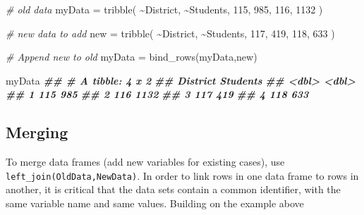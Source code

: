 \documentclass[
  12pt,
]{krantz}
\newenvironment{Shaded}{\begin{snugshade}}{\end{snugshade}}
\newcommand{\CommentTok}[1]{\textcolor[rgb]{0.56,0.35,0.01}{\textit{#1}}}
\newcommand{\DecValTok}[1]{\textcolor[rgb]{0.00,0.00,0.81}{#1}}
\newcommand{\DocumentationTok}[1]{\textcolor[rgb]{0.56,0.35,0.01}{\textbf{\textit{#1}}}}
\newcommand{\FunctionTok}[1]{\textcolor[rgb]{0.00,0.00,0.00}{#1}}
\newcommand{\NormalTok}[1]{#1}
\newcommand{\OtherTok}[1]{\textcolor[rgb]{0.56,0.35,0.01}{#1}}
\newcommand{\SpecialCharTok}[1]{\textcolor[rgb]{0.00,0.00,0.00}{#1}}
\begin{document}
\begin{Shaded}
\begin{Highlighting}[]
  \CommentTok{\# old data}
\NormalTok{    myData }\OtherTok{=} \FunctionTok{tribble}\NormalTok{(}
      \SpecialCharTok{\textasciitilde{}}\NormalTok{District, }\SpecialCharTok{\textasciitilde{}}\NormalTok{Students,}
      \DecValTok{115}\NormalTok{, }\DecValTok{985}\NormalTok{,}
      \DecValTok{116}\NormalTok{, }\DecValTok{1132}
\NormalTok{    )}

  \CommentTok{\# new data to add}
\NormalTok{    new }\OtherTok{=} \FunctionTok{tribble}\NormalTok{(}
      \SpecialCharTok{\textasciitilde{}}\NormalTok{District, }\SpecialCharTok{\textasciitilde{}}\NormalTok{Students,}
      \DecValTok{117}\NormalTok{, }\DecValTok{419}\NormalTok{,}
      \DecValTok{118}\NormalTok{, }\DecValTok{633}
\NormalTok{    )}
    
  \CommentTok{\# Append new to old}
\NormalTok{    myData }\OtherTok{=} \FunctionTok{bind\_rows}\NormalTok{(myData,new)}
    
\NormalTok{    myData}
\DocumentationTok{\#\# \# A tibble: 4 x 2}
\DocumentationTok{\#\#   District Students}
\DocumentationTok{\#\#      \textless{}dbl\textgreater{}    \textless{}dbl\textgreater{}}
\DocumentationTok{\#\# 1      115      985}
\DocumentationTok{\#\# 2      116     1132}
\DocumentationTok{\#\# 3      117      419}
\DocumentationTok{\#\# 4      118      633}
\end{Highlighting}
\end{Shaded}

\hypertarget{merging}{%
\subsection{Merging}\label{merging}}

To merge data frames (add new variables for existing cases), use \texttt{left\_join(OldData,NewData)}. In order to link rows in one data frame to rows in another, it is critical that the data sets contain a common identifier, with the same variable name and same values. Building on the example above
\end{document}
